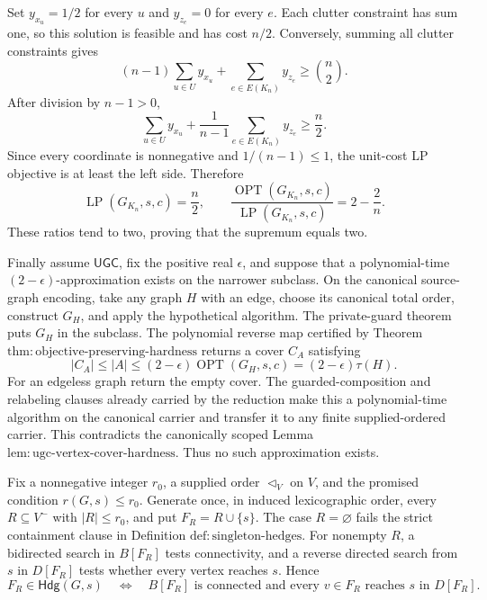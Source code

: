 Set \(y_{x_u}=1/2\) for every \(u\) and \(y_{z_e}=0\) for every \(e\).
Each clutter constraint has sum one, so this solution is feasible and has
cost \(n/2\).  Conversely, summing all clutter constraints gives
\[
 (n-1)\sum_{u\in U}y_{x_u}+\sum_{e\in E(K_n)}y_{z_e}
 \geq\binom n2.
\]
After division by \(n-1>0\),
\[
 \sum_{u\in U}y_{x_u}
 +\frac1{n-1}\sum_{e\in E(K_n)}y_{z_e}\geq\frac n2.
\]
Since every coordinate is nonnegative and \(1/(n-1)\leq1\), the unit-cost
LP objective is at least the left side.  Therefore
\[
 \operatorname{LP}(G_{K_n},s,c)=\frac n2,
 \qquad
 \frac{\operatorname{OPT}(G_{K_n},s,c)}
      {\operatorname{LP}(G_{K_n},s,c)}
 =2-\frac2n.
\]
These ratios tend to two, proving that the supremum equals two.

Finally assume \(\mathsf{UGC}\), fix the positive real
\(\epsilon\), and suppose that a polynomial-time
\((2-\epsilon)\)-approximation exists on the narrower subclass.  On the
canonical source-graph encoding, take any graph \(H\) with an edge, choose
its canonical total order, construct \(G_H\), and apply the hypothetical
algorithm.  The private-guard theorem puts \(G_H\) in the subclass.  The
polynomial reverse map certified by Theorem
\(\mathrm{thm{:}objective\mbox{-}preserving\mbox{-}hardness}\) returns a
cover \(C_A\) satisfying
\[
 |C_A|\leq|A|
 \leq(2-\epsilon)\operatorname{OPT}(G_H,s,c)
 =(2-\epsilon)\tau(H).
\]
For an edgeless graph return the empty cover.  The guarded-composition and
relabeling clauses already carried by the reduction make this a
polynomial-time algorithm on the canonical carrier and transfer it to any
finite supplied-ordered carrier.  This contradicts the canonically scoped
Lemma \(\mathrm{lem{:}ugc\mbox{-}vertex\mbox{-}cover\mbox{-}hardness}\).
Thus no such approximation exists.

Fix a nonnegative integer \(r_0\), a supplied order
\(\triangleleft_V\) on \(V\), and the promised condition
\(r(G,s)\leq r_0\).  Generate once, in induced lexicographic order, every
\(R\subseteq V^{-}\) with \(|R|\leq r_0\), and put
\(F_R=R\cup\{s\}\).  The case \(R=\varnothing\) fails the strict
containment clause in Definition \(\mathrm{def{:}singleton\mbox{-}hedges}\).
For nonempty \(R\), a bidirected search in \(B[F_R]\) tests connectivity,
and a reverse directed search from \(s\) in \(D[F_R]\) tests whether every
vertex reaches \(s\).  Hence
\[
 F_R\in\mathsf{Hdg}(G,s)
 \quad\Longleftrightarrow\quad
 B[F_R]\text{ is connected and every }v\in F_R
 \text{ reaches }s\text{ in }D[F_R].
\]


